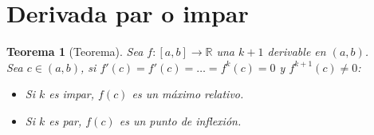 \documentclass{article}
\newtheorem{derivada_par_impar}{Teorema}
\begin{document}
\section{Derivada par o impar}
\begin{derivada_par_impar}[Teorema]
    Sea $f: [a,b] \to \mathbb{R}$ una $k+1$ derivable en $(a,b)$.\\
    Sea $c \in (a,b)$, si $f'(c)=f'(c)=\dots=f^k(c)=0$ y $f^{k+1}(c) \neq 0$:
    \begin{itemize}
        \item Si $k$ es impar, $f(c)$ es un máximo relativo.
        \item Si $k$ es par, $f(c)$ es un punto de inflexión.
    \end{itemize}
    
\end{derivada_par_impar}
\end{document}
